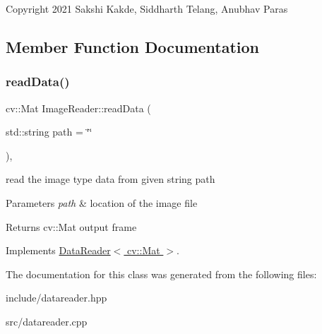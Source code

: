 Copyright 2021 Sakshi Kakde, Siddharth Telang, Anubhav Paras 

\subsection{Member Function Documentation}
\mbox{\label{classImageReader_a453f68fc55ae911476514068873f9a3f}} 
\subsubsection{\texorpdfstring{read\+Data()}{readData()}}
{\footnotesize\ttfamily cv\+::\+Mat Image\+Reader\+::read\+Data (\begin{DoxyParamCaption}\item[{std\+::string}]{path = {\ttfamily \char`\"{}\char`\"{}} }\end{DoxyParamCaption})\hspace{0.3cm}{\ttfamily [override]}, {\ttfamily [virtual]}}



read the image type data from given string path 


\begin{DoxyParams}{Parameters}
{\em path} & location of the image file \\
\hline
\end{DoxyParams}
\begin{DoxyReturn}{Returns}
cv\+::\+Mat output frame 
\end{DoxyReturn}


Implements \hyperlink{classDataReader}{Data\+Reader$<$ cv\+::\+Mat $>$}.



The documentation for this class was generated from the following files\+:\begin{DoxyCompactItemize}
\item 
include/datareader.\+hpp\item 
src/datareader.\+cpp\end{DoxyCompactItemize}

